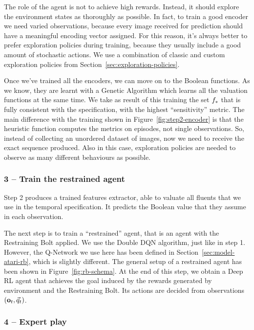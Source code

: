 The role of the agent is not to achieve high rewards. Instead, it should
explore the environment states as thoroughly as possible. In fact, to train a
good encoder we need varied observations, because every image received for
prediction should have a meaningful encoding vector assigned.  For this
reason, it's always better to prefer exploration policies during training,
because they usually include a good amount of stochastic actions. We use a
combination of classic and custom exploration policies from
Section~\ref{sec:exploration-policies}.

Once we've trained all the encoders, we can move on to the Boolean functions.
As we know, they are learnt with a Genetic Algorithm which learns all the
valuation functions at the same time. We take as result of this training the
set ${f}_*$ that is fully consistent with the specification, with the
highest ``sensitivity'' metric. The main difference with the training shown in
Figure~\ref{fig:step2-encoder} is that the heuristic function computes the
metrics on episodes, not single observations. So, instead of collecting an
unordered dataset of images, now we need to receive the exact sequence
produced. Also in this case, exploration policies are needed to observe as
many different behaviours as possible.


\subsubsection*{3 -- Train the restrained agent}

Step 2 produces a trained features extractor, able to valuate all fluents that
we use in the temporal specification. It predicts the Boolean value that they
assume in each observation.

The next step is to train a ``restrained'' agent, that is an agent with the
Restraining Bolt applied. We use the Double DQN algorithm, just like in step
1. However, the Q-Network we use here has been defined in
Section~\ref{sec:model-atari-rb}, which is slightly different. The general
setup of a restrained agent has been shown in Figure~\vref{fig:rb-schema}.  At
the end of this step, we obtain a Deep RL agent that achieves the goal induced
by the rewards generated by environment and the Restraining Bolt. Its actions
are decided from observations~$(\mathbf{o}_t, \vec{q}_t)$.


\subsubsection*{4 -- Expert play}


